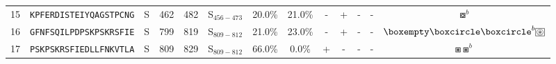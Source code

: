 \begin{tabular}{rcccccccccccc}
15 &  \texttt{KPFERDISTEIYQAGSTPCNG} &       S &    462 &   482 &  S$_{456-473}$ &                          20.0\% &                           21.0\% &          - &           + &          - &           - &                                                                                                 $ \boxcircle^b $ \\
16 &  \texttt{GFNFSQILPDPSKPSKRSFIE} &       S &    799 &   819 &  S$_{809-812}$ &                          21.0\% &                           23.0\% &          - &           + &          - &           - &                            $ \boxempty \boxcircle \boxcircle^b \setlength{\fboxsep}{0.5pt} \boxed{\circledast} $ \\
17 &  \texttt{PSKPSKRSFIEDLLFNKVTLA} &       S &    809 &   829 &  S$_{809-812}$ &                          66.0\% &                            0.0\% &          + &           - &          - &           - &                                                                                            $ \boxast \boxast^b $ \\
\bottomrule
\end{tabular}
